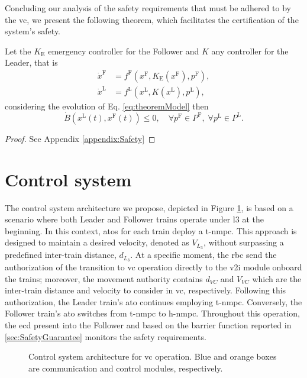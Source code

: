 Concluding our analysis of the safety requirements that must be adhered to by the \gls{vc}, we present the following theorem, which facilitates the certification of the system's safety.
%
\begin{theorem} \label{theom:Safety}
	Let the $ K_{\mathrm{E}}$ emergency controller for the Follower and $K$ any controller for the Leader, that is
	\begin{equation} \label{eq:theoremModel}
		\begin{split} 
			\dot{x}^{\mathrm{F}}&= f^{\mathrm{F}}\left({x}^{\mathrm{F}}, K_{\mathrm{E}}\left({x}^{\mathrm{F}} \right),  p^{\mathrm{F}}  \right), \\
			\dot{x}^{\mathrm{L}}&= f^{\mathrm{L}}\left({x}^{\mathrm{L}},  K\left({x}^{\mathrm{L}} \right),  p^{\mathrm{L}}  \right),
		\end{split}
	\end{equation}
	considering the evolution of Eq. \eqref{eq:theoremModel} then
	\begin{equation*}
		\dot{B}\left(x^\mathrm{L}\left(t\right),x^\mathrm{F}\left(t\right)\right) \leq 0, \quad \forall p^\mathrm{F} \in P^\mathrm{F}, \; \forall p^\mathrm{L} \in P^\mathrm{L}.
	\end{equation*}
	\begin{proof}
		See Appendix \ref{appendix:Safety}
	\end{proof}
\end{theorem}





\section{Control system}
\label{sec:controlsystem}



The control system architecture we propose, depicted in Figure \ref{fig:controlSystem}, is based on a scenario where both Leader and Follower trains operate under \gls{l3} at the beginning. In this context, \glspl{ato} for each train deploy a \gls{t-nmpc}. This approach is designed to maintain a desired velocity, denoted as $V_{\textit{L}_3}$, without surpassing a predefined inter-train distance, $d_{\textit{L}_3}$. At a specific moment, the \gls{rbc} send the authorization of the transition to \gls{vc} operation  directly to the \gls{v2i} module onboard the trains; moreover, the movement authority contains $d_{\textit{VC}}$ and $V_{\textit{VC}}$ which are the inter-train distance and velocity to consider in \gls{vc}, respectively. Following this authorization, the Leader train's \gls{ato} continues employing \gls{t-nmpc}. Conversely, the Follower train's \gls{ato} switches from \gls{t-nmpc} to \gls{h-nmpc}. Throughout this operation, the \gls{ecd} present into the Follower and based on the barrier function reported in \ref{sec:SafetyGuarantee}  monitors the safety requirements. 
%
\begin{figure}[!ht]
	\resizebox{\linewidth}{!}{}
	\caption{Control system architecture for \gls{vc} operation. Blue and orange boxes are communication and control modules, respectively. }
	\label{fig:controlSystem}
\end{figure}


